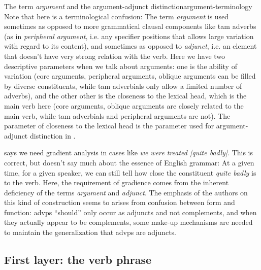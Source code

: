 \documentclass[UTF8, a4paper, oneside, scheme=plain, 12pt]{ctexbook}
\newcommand*{\citepage}[1]{p.~{#1}}
\newcommand*{\term}[1]{\emph{#1}}
\newcommand{\form}[1]{\emph{#1}}
\begin{document}
\begin{infobox}{The term \term{argument} and the argument-adjunct distinction}{argument-terminology}
    Note that here is a terminological confusion:
    The term \term{argument} is used sometimes 
    as opposed to more grammatical clausal components like \acs{tam} adverbs
    (as in \term{peripheral argument}, 
    i.e. any specifier positions that allows large variation with regard to its content),
    and sometimes as opposed to \term{adjunct},
    i.e. an element that doesn't have very strong relation with the verb.
    Here we have two descriptive parameters when we talk about arguments:
    one is the ability of variation
    (core arguments, peripheral arguments, oblique arguments can be filled by diverse constituents,
    while \acs{tam} adverbials only allow a limited number of adverbs),
    and the other other is the closeness to the lexical head, which is the main verb here 
    (core arguments, oblique arguments are closely related to the main verb,
    while \acs{tam} adverbials and peripheral arguments are not).
    The parameter of closeness to the lexical head is the parameter used for argument-adjunct distinction
    in .

    \citet[\citepage{732}]{quirk1985} says we need gradient analysis 
    in cases like \form{we were treated [quite badly]}.
    This is correct, but doesn't say much about the essence of English grammar:
    At a given time, for a given speaker,
    we can still tell how close the constituent \form{quite badly} is to the verb.
    Here, the requirement of gradience 
    comes from the inherent deficiency of the terms \term{argument} and \term{adjunct}. 
    The emphasis of the authors on this kind of construction 
    seems to arises from confusion between form and function:
    \acs{advp}s ``should'' only occur as adjuncts and not complements,
    and when they actually appear to be complements,
    some make-up mechanisms are needed to maintain the generalization that \acs{advp}s are adjuncts.
\end{infobox}


\subsection{First layer: the verb phrase}\label{sec:clause.vp}
\end{document}
